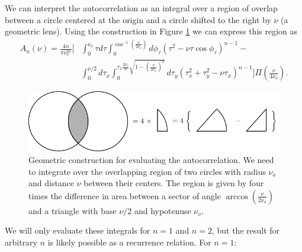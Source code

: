 \documentclass[]{osa-article}
\begin{document}
We can interpret the autocorrelation as an integral over a region of overlap
between a circle centered at the origin and a circle shifted to the right by
$\nu$ (a geometric lens). Using the construction in Figure \ref{fig:geometry} we
can express this region as
\begin{align}
  A_n(\nu) = \frac{4n}{\pi\nu_o^{2n}}\Bigg[&\int_0^{\nu_o}\tau d\tau\int_0^{\cos^{-1}\left(\frac{\nu}{2\nu_o}\right)}d\phi_{\tau}(\tau^2 - \nu\tau\cos\phi_{\tau})^{n-1} -\nonumber \\ &\int_{0}^{\nu/2}d\tau_x\int_0^{\tau_x\frac{2\nu_o}{\nu}\sqrt{1 - \left(\frac{\nu}{2\nu_o}\right)^2}}d\tau_y(\tau_x^2 + \tau_y^2 - \nu\tau_x)^{n-1}\Bigg]\Pi\left(\frac{\nu}{4\nu_o}\right).
\end{align}
\begin{figure}[h]
 \centering
   \centering
   \includegraphics[width = 1.0\textwidth]{../figures/autocorrelation/autocorrelation.pdf}
   \caption{Geometric construction for evaluating the autocorrelation. We need
     to integrate over the overlapping region of two circles with radius $\nu_o$
     and distance $\nu$ between their centers. The region is given by four times
     the difference in area between a sector of angle
     $\arccos\left(\frac{\nu}{2\nu_o}\right)$ and a triangle with base $\nu/2$
     and hypotenuse $\nu_o$.}
   \label{fig:geometry}
 \end{figure}

 We will only evaluate these integrals for $n=1$ and $n=2$, but the result for
 arbitrary $n$ is likely possible as a recurrence relation. For $n=1$:
\end{document}
